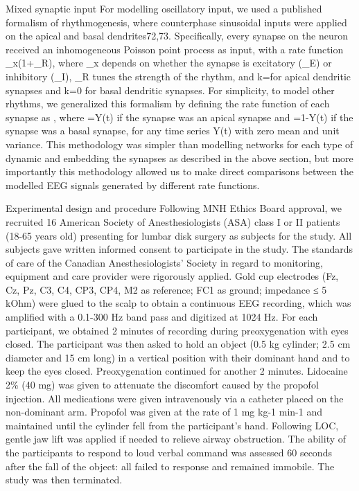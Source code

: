 Mixed synaptic input
For modelling oscillatory input, we used a published formalism of rhythmogenesis, where counterphase sinusoidal inputs were applied on the apical and basal dendrites72,73. Specifically, every synapse on the neuron received an inhomogeneous Poisson point process as input, with a rate function \lambda_x\left(1+\alpha_R\right), where \lambda_x depends on whether the synapse is excitatory \left(\lambda_E\right) or inhibitory (\lambda_I), \alpha_R tunes the strength of the rhythm, and k=\pi for apical dendritic synapses and k=0 for basal dendritic synapses. For simplicity, to model other rhythms, we generalized this formalism by defining the rate function of each synapse as , where =Y(t) if the synapse was an apical synapse and =1-Y(t) if the synapse was a basal synapse, for any time series Y(t) with zero mean and unit variance. This methodology was simpler than modelling networks for each type of dynamic and embedding the synapses as described in the above section, but more importantly this methodology allowed us to make direct comparisons between the modelled EEG signals generated by different rate functions.

Experimental design and procedure
Following MNH Ethics Board approval, we recruited 16 American Society of Anesthesiologists (ASA) class I or II patients (18-65 years old) presenting for lumbar disk surgery as subjects for the study. All subjects gave written informed consent to participate in the study. The standards of care of the Canadian Anesthesiologists' Society in regard to monitoring, equipment and care provider were rigorously applied. Gold cup electrodes (Fz, Cz, Pz, C3, C4, CP3, CP4, M2 as reference; FC1 as ground; impedance ≤ 5 kOhm) were glued to the scalp to obtain a continuous EEG recording, which was amplified with a 0.1-300 Hz band pass and digitized at 1024 Hz. For each participant, we obtained 2 minutes of recording during preoxygenation with eyes closed. The participant was then asked to hold an object (0.5 kg cylinder; 2.5 cm diameter and 15 cm long) in a vertical position with their dominant hand and to keep the eyes closed. Preoxygenation continued for another 2 minutes. Lidocaine 2\% (40 mg) was given to attenuate the discomfort caused by the propofol injection. All medications were given intravenously via a catheter placed on the non-dominant arm. Propofol was given at the rate of 1 mg kg-1 min-1 and maintained until the cylinder fell from the participant’s hand. Following LOC, gentle jaw lift was applied if needed to relieve airway obstruction. The ability of the participants to respond to loud verbal command was assessed 60 seconds after the fall of the object: all failed to response and remained immobile. The study was then terminated. 

